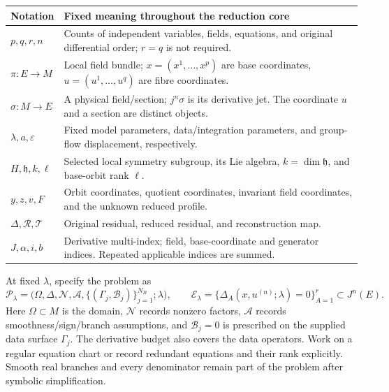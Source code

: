 \documentclass[11pt]{article}
\theoremstyle{definition}
\begin{document}
\begin{center}\small
\renewcommand{\arraystretch}{1.13}
\begin{tabularx}{\linewidth}{@{}p{3.2cm}X@{}}
\toprule
Notation & Fixed meaning throughout the reduction core \\
\midrule
$p,q,r,n$ & Counts of independent variables, fields, equations, and original differential order; $r=q$ is not required. \\
$\pi:E\to M$ & Local field bundle; $x=(x^1,\ldots,x^p)$ are base coordinates, $u=(u^1,\ldots,u^q)$ are fibre coordinates. \\
$\sigma:M\to E$ & A physical field/section; $j^n\sigma$ is its derivative jet. The coordinate $u$ and a section are distinct objects. \\
$\lambda,a,\varepsilon$ & Fixed model parameters, data/integration parameters, and group-flow displacement, respectively. \\
$H,\mathfrak h,k,\ell$ & Selected local symmetry subgroup, its Lie algebra, $k=\dim\mathfrak h$, and base-orbit rank $\ell$. \\
$y,z,v,F$ & Orbit coordinates, quotient coordinates, invariant field coordinates, and the unknown reduced profile. \\
$\Delta,\mathcal R,\mathcal T$ & Original residual, reduced residual, and reconstruction map. \\
$J,\alpha,i,b$ & Derivative multi-index; field, base-coordinate and generator indices. Repeated applicable indices are summed. \\
\bottomrule
\end{tabularx}
\end{center}

At fixed $\lambda$, specify the problem as
\begin{equation}
 \mathcal P_\lambda=
 \bigl(\Omega,\Delta,\mathcal N,\mathcal A,
       \{(\Gamma_j,\mathcal B_j)\}_{j=1}^{N_B};\lambda\bigr),\qquad
 \mathcal E_\lambda=\{\Delta_A(x,u^{(n)};\lambda)=0\}_{A=1}^r\subset J^n(E).
 \label{eq:formal-problem}
\end{equation}
Here $\Omega\subset M$ is the domain, $\mathcal N$ records nonzero factors,
$\mathcal A$ records smoothness/sign/branch assumptions, and $\mathcal B_j=0$
is prescribed on the supplied data surface $\Gamma_j$. The derivative budget
also covers the data operators. Work on a regular equation chart or record
redundant equations and their rank explicitly. Smooth real branches and every
denominator remain part of the problem after symbolic simplification.
\end{document}
